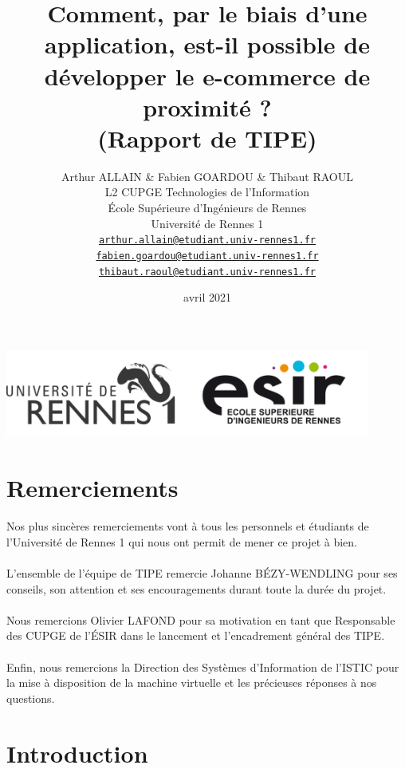 \documentclass[a4paper, 12pt]{article}
\author{ \vspace{1cm} Arthur ALLAIN \& Fabien GOARDOU \& Thibaut RAOUL\\ 
		L2 CUPGE Technologies de l'Information\\
		École Supérieure d'Ingénieurs de Rennes\\ \vspace{1cm}
		Université de Rennes 1\\ 
		\texttt{\href{mailto:arthur.allain@etudiant.univ-rennes1.fr}{arthur.allain@etudiant.univ-rennes1.fr}}\\
		\texttt{\href{mailto:fabien.goardou@etudiant.univ-rennes1.fr}{fabien.goardou@etudiant.univ-rennes1.fr}}\\
		\texttt{\href{mailto:thibaut.raoul@etudiant.univ-rennes1.fr}{thibaut.raoul@etudiant.univ-rennes1.fr}}}
\title{{\textbf{Comment, par le biais d’une application, est-il possible de développer le e-commerce de proximité ?}\\(Rapport de TIPE)}}
\date{avril 2021}
\begin{document}
\maketitle
\begin{center}
	\includegraphics[width=12cm]{fig/banniere_logos}
\end{center}
\thispagestyle{empty}
\newpage
\tableofcontents
\newpage
\listoffigures
\newpage
\section*{Remerciements}
\paragraph{}Nos plus sincères remerciements vont à tous les personnels et étudiants de l'Université de Rennes 1 qui nous ont permit de mener ce projet à bien.

\paragraph{}L'ensemble de l'équipe de TIPE remercie Johanne BÉZY-WENDLING pour ses conseils, son attention et ses encouragements durant toute la durée du projet.

\paragraph{}Nous remercions Olivier LAFOND pour sa motivation en tant que Responsable des CUPGE de l'ÉSIR dans le lancement et l'encadrement général des TIPE.

\paragraph{}Enfin, nous remercions la Direction des Systèmes d'Information de l'ISTIC pour la mise à disposition de la machine virtuelle et les précieuses réponses à nos questions. 

\newpage

\section{Introduction}
\end{document}
